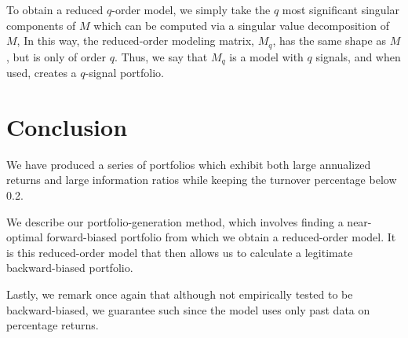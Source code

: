 \documentclass{article}
\begin{document}
    To obtain a reduced $q$-order model, 
        we simply take the $q$ most significant singular components of $M$
        which can be computed via a singular value decomposition of $M$,
    In this way, the reduced-order modeling matrix, $M_q$,
        has the same shape as $M$, but is only of order $q$.
    Thus, we say that $M_q$ is a model with $q$ signals,
        and when used, creates a $q$-signal portfolio.

\section{Conclusion}
    
    We have produced a series of portfolios 
        which exhibit both large annualized returns and 
        large information ratios while
        keeping the turnover percentage below 0.2.

    We describe our portfolio-generation method,
        which involves finding a near-optimal forward-biased portfolio
        from which we obtain a reduced-order model.
    It is this reduced-order model that then allows us to calculate
        a legitimate backward-biased portfolio.

    Lastly, we remark once again that although not empirically tested to
        be backward-biased,
        we guarantee such since the model uses only past data on percentage returns.
\end{document}
